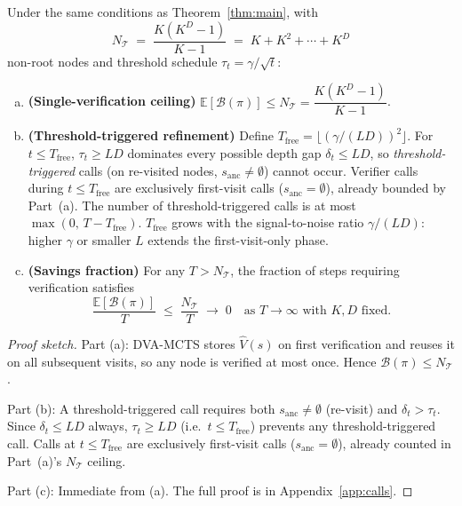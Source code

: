 \begin{theorem}
\label{thm:calls}
Under the same conditions as Theorem~\ref{thm:main}, with
\[
  N_{\mathcal{T}} \;=\; \frac{K(K^D-1)}{K-1} \;=\; K + K^2 + \cdots + K^D
\]
non-root nodes and threshold schedule $\tau_t = \gamma/\sqrt{t}$:

\begin{enumerate}[(a)]
  \item \textbf{(Single-verification ceiling)}
        $\mathbb{E}[\mathcal{B}(\pi)] \leq N_{\mathcal{T}} = \dfrac{K(K^D-1)}{K-1}$.

  \item \textbf{(Threshold-triggered refinement)}
        Define $T_{\mathrm{free}} = \lfloor(\gamma/(LD))^2\rfloor$.
        For $t \leq T_{\mathrm{free}}$, $\tau_t \geq LD$ dominates every possible
        depth gap $\delta_t \leq LD$, so \emph{threshold-triggered} calls
        (on re-visited nodes, $s_{\mathrm{anc}} \neq \emptyset$) cannot occur.
        Verifier calls during $t \leq T_{\mathrm{free}}$ are exclusively
        first-visit calls ($s_{\mathrm{anc}} = \emptyset$), already bounded by
        Part~(a).  The number of threshold-triggered calls is at most
        $\max(0,\, T - T_{\mathrm{free}})$.
        $T_{\mathrm{free}}$ grows with the signal-to-noise ratio $\gamma/(LD)$:
        higher $\gamma$ or smaller $L$ extends the first-visit-only phase.

  \item \textbf{(Savings fraction)}
        For any $T > N_{\mathcal{T}}$, the fraction of steps requiring verification satisfies
        \[
          \frac{\mathbb{E}[\mathcal{B}(\pi)]}{T} \;\leq\; \frac{N_{\mathcal{T}}}{T} \;\to\; 0
          \quad\text{as } T \to \infty \text{ with } K, D \text{ fixed}.
        \]
\end{enumerate}
\end{theorem}

\begin{proof}[Proof sketch]
Part (a): DVA-MCTS stores $\hat{V}(s)$ on first verification and reuses it on all
subsequent visits, so any node is verified at most once. Hence $\mathcal{B}(\pi) \leq N_{\mathcal{T}}$.

Part (b): A threshold-triggered call requires both $s_{\mathrm{anc}} \neq \emptyset$ (re-visit)
and $\delta_t > \tau_t$.  Since $\delta_t \leq LD$ always, $\tau_t \geq LD$
(i.e.\ $t \leq T_{\mathrm{free}}$) prevents any threshold-triggered call.
Calls at $t \leq T_{\mathrm{free}}$ are exclusively first-visit calls
($s_{\mathrm{anc}} = \emptyset$), already counted in Part~(a)'s $N_{\mathcal{T}}$ ceiling.

Part (c): Immediate from (a).
The full proof is in Appendix~\ref{app:calls}.
\end{proof}

